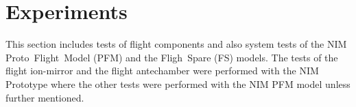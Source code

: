 \section{Experiments} \label{sec:Exp}
	
	This section includes tests of flight components and also system tests of the NIM Proto~Flight~Model (PFM) and the Fligh~Spare (FS) models. The tests of the flight ion-mirror and the flight antechamber were performed with the NIM Prototype where the other tests were performed with the NIM PFM model unless further mentioned. %


